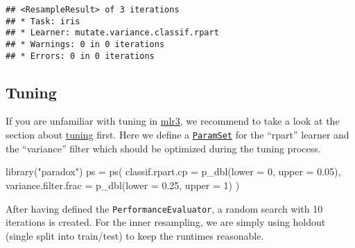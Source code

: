\documentclass[
]{scrbook}
\newenvironment{Shaded}{\begin{snugshade}}{\end{snugshade}}
\newcommand{\AttributeTok}[1]{\textcolor[rgb]{0.77,0.63,0.00}{#1}}
\newcommand{\DecValTok}[1]{\textcolor[rgb]{0.00,0.00,0.81}{#1}}
\newcommand{\FloatTok}[1]{\textcolor[rgb]{0.00,0.00,0.81}{#1}}
\newcommand{\FunctionTok}[1]{\textcolor[rgb]{0.00,0.00,0.00}{#1}}
\newcommand{\NormalTok}[1]{#1}
\newcommand{\OtherTok}[1]{\textcolor[rgb]{0.56,0.35,0.01}{#1}}
\newcommand{\SpecialCharTok}[1]{\textcolor[rgb]{0.00,0.00,0.00}{#1}}
\newcommand{\StringTok}[1]{\textcolor[rgb]{0.31,0.60,0.02}{#1}}
\renewenvironment{Shaded} {\begin{snugshade}\small} {\end{snugshade}}
\begin{document}
\begin{verbatim}
## <ResampleResult> of 3 iterations
## * Task: iris
## * Learner: mutate.variance.classif.rpart
## * Warnings: 0 in 0 iterations
## * Errors: 0 in 0 iterations
\end{verbatim}

\hypertarget{pipe-tuning}{%
\subsection{Tuning}\label{pipe-tuning}}

If you are unfamiliar with tuning in \href{https://mlr3.mlr-org.com}{mlr3}, we recommend to take a look at the section about \protect\hyperlink{tuning}{tuning} first.
Here we define a \href{https://paradox.mlr-org.com/reference/ParamSet.html}{\texttt{ParamSet}} for the ``rpart'' learner and the ``variance'' filter which should be optimized during the tuning process.

\begin{Shaded}
\begin{Highlighting}[]
\FunctionTok{library}\NormalTok{(}\StringTok{"paradox"}\NormalTok{)}
\NormalTok{ps }\OtherTok{=} \FunctionTok{ps}\NormalTok{(}
  \AttributeTok{classif.rpart.cp =} \FunctionTok{p\_dbl}\NormalTok{(}\AttributeTok{lower =} \DecValTok{0}\NormalTok{, }\AttributeTok{upper =} \FloatTok{0.05}\NormalTok{),}
  \AttributeTok{variance.filter.frac =} \FunctionTok{p\_dbl}\NormalTok{(}\AttributeTok{lower =} \FloatTok{0.25}\NormalTok{, }\AttributeTok{upper =} \DecValTok{1}\NormalTok{)}
\NormalTok{)}
\end{Highlighting}
\end{Shaded}

After having defined the \texttt{PerformanceEvaluator}, a random search with 10 iterations is created.
For the inner resampling, we are simply using holdout (single split into train/test) to keep the runtimes reasonable.

\begin{Shaded}
\end{Shaded}
\end{document}
